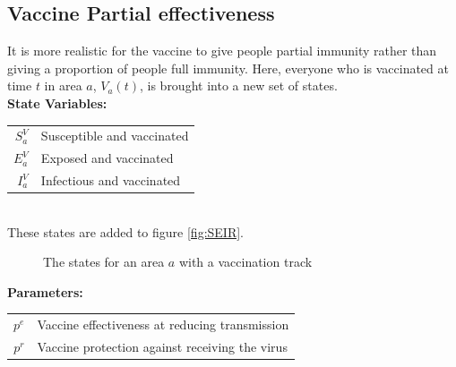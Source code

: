 \documentclass{article}
\begin{document}
\subsection{Vaccine Partial effectiveness}\label{appendix:VPE}
It is more realistic for the vaccine to give people partial immunity rather than giving a proportion of people full immunity. Here, everyone who is vaccinated at time $t$ in area $a$, $V_a(t)$, is brought into a new set of states.\\
\textbf{State Variables:}\\
\begin{tabular}{rl}
$S^V_a$ &Susceptible and vaccinated\\
$E^V_a$ &Exposed and vaccinated\\
$I^V_a$ &Infectious and vaccinated\\
\end{tabular}\\
These states are added to figure \ref{fig:SEIR}.
\begin{figure}[!ht]
    \centering
{}
    \caption{The states for an area $a$ with a vaccination track}
    \label{fig:SEIR-V}
\end{figure}

\textbf{Parameters:}\\
\begin{tabular}{rl}
$p^e$ &Vaccine effectiveness at reducing transmission\\
$p^r$ &Vaccine protection against receiving the virus
\end{tabular}\\
\end{document}

